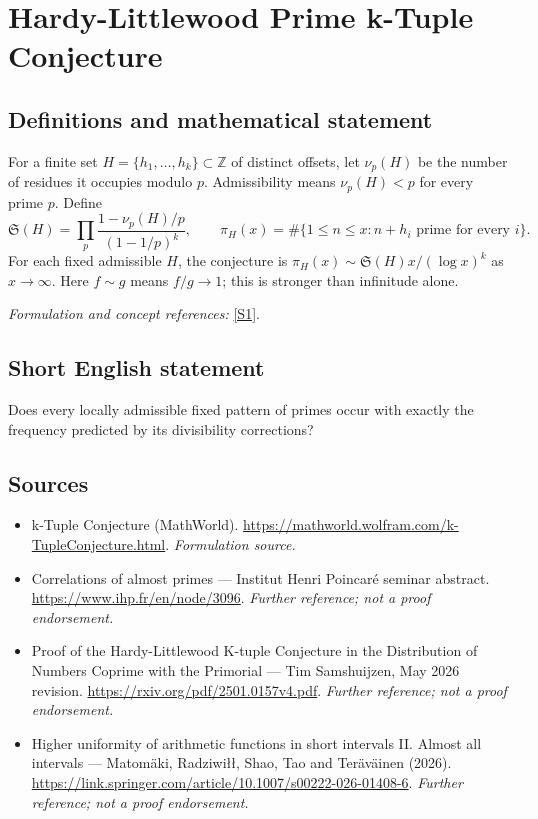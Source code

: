 \documentclass[11pt]{article}
\begin{document}
\section*{\texorpdfstring{Hardy-Littlewood Prime k-Tuple Conjecture}{Hardy-Littlewood Prime k-Tuple Conjecture}}\label{statement}
\subsection{Definitions and mathematical statement}
For a finite set $H=\{h_1,\ldots,h_k\}\subset{\mathbb{Z}}$ of distinct offsets, let $\nu_p(H)$ be the number of residues it occupies modulo $p$. Admissibility means $\nu_p(H)<p$ for every prime $p$. Define
\[
 \mathfrak S(H)=\prod_p\frac{1-\nu_p(H)/p}{(1-1/p)^k},\qquad
 \pi_H(x)=\#\{1\le n\le x:n+h_i\text{ prime for every }i\}.
\]
For each fixed admissible $H$, the conjecture is $\pi_H(x)\sim\mathfrak S(H)x/(\log x)^k$ as $x\to\infty$. Here $f\sim g$ means $f/g\to1$; this is stronger than infinitude alone.
\par\smallskip\textit{Formulation and concept references:} \href{https://mathworld.wolfram.com/k-TupleConjecture.html}{[S1]}.

\subsection{Short English statement}
Does every locally admissible fixed pattern of primes occur with exactly the frequency predicted by its divisibility corrections?
\subsection{Sources}
\begin{itemize}
\item[S1]k-Tuple Conjecture (MathWorld).
\url{https://mathworld.wolfram.com/k-TupleConjecture.html}.
\textit{Formulation source.}
\item[S2]Correlations of almost primes — Institut Henri Poincaré seminar abstract.
\url{https://www.ihp.fr/en/node/3096}.
\textit{Further reference; not a proof endorsement.}
\item[S3]Proof of the Hardy-Littlewood K-tuple Conjecture in the Distribution of Numbers Coprime with the Primorial — Tim Samshuijzen, May 2026 revision.
\url{https://rxiv.org/pdf/2501.0157v4.pdf}.
\textit{Further reference; not a proof endorsement.}
\item[S4]Higher uniformity of arithmetic functions in short intervals II. Almost all intervals — Matomäki, Radziwiłł, Shao, Tao and Teräväinen (2026).
\url{https://link.springer.com/article/10.1007/s00222-026-01408-6}.
\textit{Further reference; not a proof endorsement.}
\end{itemize}
\end{document}

